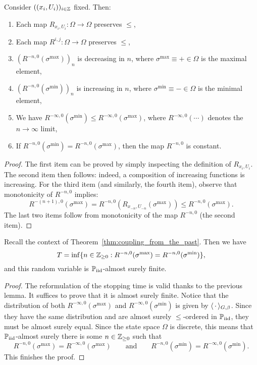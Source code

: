 \begin{lemma}
    Consider $((x_i,U_i))_{i\in\mathbb Z}$ fixed. Then:
    \begin{enumerate}
        \item Each map $R_{x_i,U_i}:\Omega\to\Omega$ preserves $\leq$,
        \item Each map $R^{i,j}:\Omega\to\Omega$ preserves $\leq$,
        \item $(R^{-n,0}(\sigma^{\max}))_n$ is decreasing in $n$, where $\sigma^{\max}\equiv+\in\Omega$ is the maximal element,
        \item $(R^{-n,0}(\sigma^{\min}))_n$ is increasing in $n$, where $\sigma^{\min}\equiv-\in\Omega$ is the minimal element,
        \item We have $R^{-\infty,0}(\sigma^{\min})\leq R^{-\infty,0}(\sigma^{\max})$,
        where $R^{-\infty,0}(\cdots)$ denotes the $n\to\infty$ limit,
        \item If  $R^{-n,0}(\sigma^{\min})= R^{-n,0}(\sigma^{\max})$, then the map $R^{-n,0}$ is constant.
    \end{enumerate}
\end{lemma}

\begin{proof}
    The first item can be proved by simply inspecting the definition of $R_{x_i,U_i}$.
    The second item then follows: indeed, a composition of increasing functions is increasing.
    For the third item (and similarly, the fourth item), observe that monotonicity of $R^{-n,0}$ implies:
    \[
        R^{-(n+1),0}(\sigma^{\max})
        =
        R^{-n,0}(R_{x_{-n},U_{-n}}(\sigma^{\max}))
        \leq
        R^{-n,0}(\sigma^{\max}).
    \]
    The last two items follow from monotonicity of the map $R^{-n,0}$ (the second item).
\end{proof}


\begin{lemma}
    Recall the context of Theorem~\ref{thm:coupling_from_the_past}.
    Then we have
    \[
        T=\inf\{n\in\mathbb Z_{\geq 0}:R^{-n,0}(\sigma^{\max})=R^{-n,0}(\sigma^{\min})\},
    \]
    and this random variable is $\mathbb P_{\operatorname{iid}}$-almost surely finite.
\end{lemma}

\begin{proof}
    The reformulation of the stopping time is valid thanks to the previous lemma.
    It suffices to prove that it is almost surely finite.
    Notice that the distribution of both $R^{-\infty,0}(\sigma^{\max})$ and $R^{-\infty,0}(\sigma^{\min})$
    is given by $\langle\,\cdot\,\rangle_{G,\beta}$.
    Since they have the same distribution and are almost surely $\leq$-ordered in $\mathbb P_{\operatorname{iid}}$,
    they must be almost surely equal.
    Since the state space $\Omega$ is discrete,
    this means that $\mathbb P_{\operatorname{iid}}$-almost surely
    there is some $n\in\mathbb Z_{\geq 0}$ such that
    \[
        R^{-n,0}(\sigma^{\max})=
        R^{-\infty,0}(\sigma^{\max})
        \qquad
        \text{and}
        \qquad
        R^{-n,0}(\sigma^{\min})=
        R^{-\infty,0}(\sigma^{\min}).
    \]
    This finishes the proof.
\end{proof}
